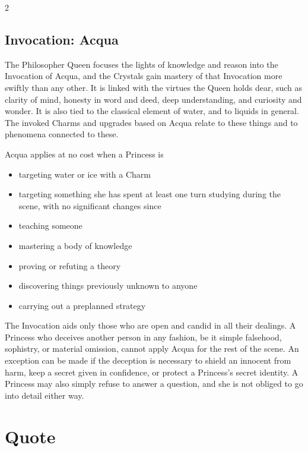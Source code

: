 \begin{multicols}{2}
\subsection*{Invocation: Acqua}
The Philosopher Queen focuses the lights of knowledge and reason into the Invocation of Acqua, and the Crystals gain mastery of that Invocation more swiftly than any other. It is linked with the virtues the Queen holds dear, such as clarity of mind, honesty in word and deed, deep understanding, and curiosity and wonder. It is also tied to the classical element of water, and to liquids in general. The invoked Charms and upgrades based on Acqua relate to these things and to phenomena connected to these.

Acqua applies at no cost when a Princess is
\begin{itemize}
\item targeting water or ice with a Charm
\item targeting something she has spent at least one turn studying during the scene, with no significant changes since
\item teaching someone
\item mastering a body of knowledge
\item proving or refuting a theory
\item discovering things previously unknown to anyone
\item carrying out a preplanned strategy
\end{itemize}

The Invocation aids only those who are open and candid in all their dealings. A Princess who deceives another person in any fashion, be it simple falsehood, sophistry, or material omission, cannot apply Acqua for the rest of the scene. An exception can be made if the deception is necessary to shield an innocent from harm, keep a secret given in confidence, or protect a Princess's secret identity. A Princess may also simply refuse to answer a question, and she is not obliged to go into detail either way.

\section*{Quote}


\end{multicols}
